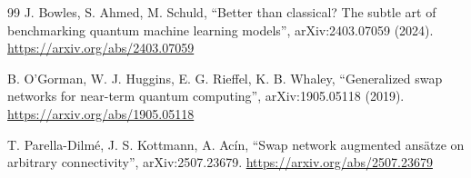 \documentclass[11pt]{article}
\begin{document}
\begin{thebibliography}{99}
 J. Bowles, S. Ahmed, M. Schuld, ``Better than classical? The subtle art of benchmarking quantum
machine learning models'', arXiv:2403.07059 (2024). \url{https://arxiv.org/abs/2403.07059}

 B. O'Gorman, W. J. Huggins, E. G. Rieffel, K. B. Whaley, ``Generalized swap networks for
near-term quantum computing'', arXiv:1905.05118 (2019). \url{https://arxiv.org/abs/1905.05118}

 T. Parella-Dilm\'e, J. S. Kottmann, A. Ac\'in, ``Swap network augmented ans\"atze on arbitrary
connectivity'', arXiv:2507.23679. \url{https://arxiv.org/abs/2507.23679}

\end{thebibliography}
\end{document}
